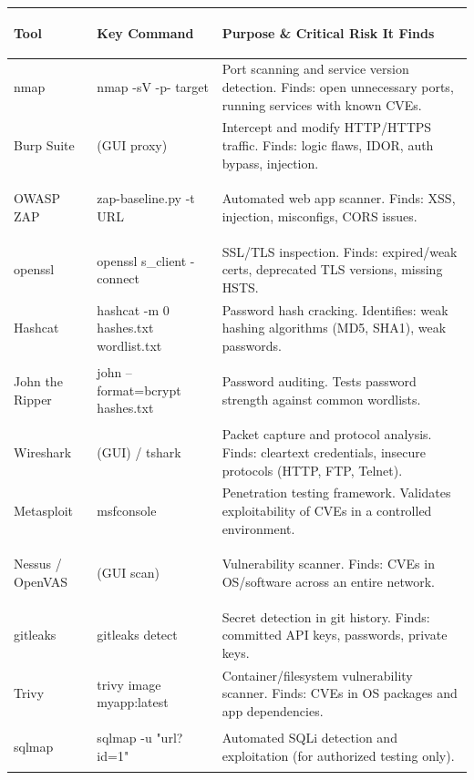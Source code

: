 \documentclass[11pt, letterpaper]{article}
\begin{document}
\noindent
{\small\renewcommand{\arraystretch}{1.6}
\begin{tabularx}{\textwidth}{>{\bfseries\raggedright\arraybackslash}p{3cm}
                              >{\ttfamily\raggedright\arraybackslash}p{4cm}
                              >{\raggedright\arraybackslash}X}
\toprule
\rowcolor{tableheaderpurple}
\textbf{Tool} & \textbf{Key Command} & \textbf{Purpose \& Critical Risk It Finds} \\
\midrule
\rowcolor{rowPu} nmap & nmap -sV -p- target & Port scanning and service version detection. Finds: open unnecessary ports, running services with known CVEs. \\
\rowcolor{rowA}  Burp Suite & (GUI proxy) & Intercept and modify HTTP/HTTPS traffic. Finds: logic flaws, IDOR, auth bypass, injection. \\
\rowcolor{rowPu} OWASP ZAP & zap-baseline.py -t URL & Automated web app scanner. Finds: XSS, injection, misconfigs, CORS issues. \\
\rowcolor{rowA}  openssl & openssl s\_client -connect & SSL/TLS inspection. Finds: expired/weak certs, deprecated TLS versions, missing HSTS. \\
\rowcolor{rowPu} Hashcat & hashcat -m 0 hashes.txt wordlist.txt & Password hash cracking. Identifies: weak hashing algorithms (MD5, SHA1), weak passwords. \\
\rowcolor{rowA}  John the Ripper & john --format=bcrypt hashes.txt & Password auditing. Tests password strength against common wordlists. \\
\rowcolor{rowPu} Wireshark & (GUI) / tshark & Packet capture and protocol analysis. Finds: cleartext credentials, insecure protocols (HTTP, FTP, Telnet). \\
\rowcolor{rowA}  Metasploit & msfconsole & Penetration testing framework. Validates exploitability of CVEs in a controlled environment. \\
\rowcolor{rowPu} Nessus / OpenVAS & (GUI scan) & Vulnerability scanner. Finds: CVEs in OS/software across an entire network. \\
\rowcolor{rowA}  gitleaks & gitleaks detect & Secret detection in git history. Finds: committed API keys, passwords, private keys. \\
\rowcolor{rowPu} Trivy & trivy image myapp:latest & Container/filesystem vulnerability scanner. Finds: CVEs in OS packages and app dependencies. \\
\rowcolor{rowA}  sqlmap & sqlmap -u "url?id=1" & Automated SQLi detection and exploitation (for authorized testing only). \\
\bottomrule
\end{tabularx}}
\end{document}
